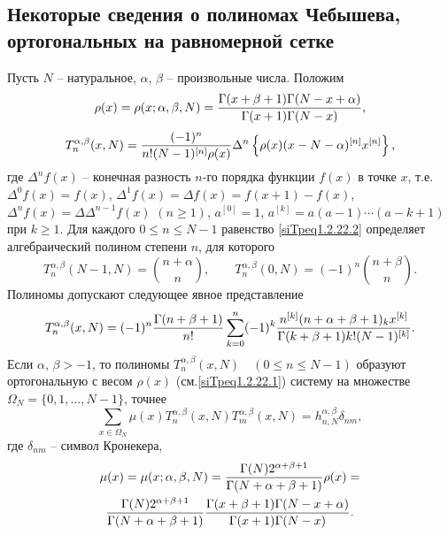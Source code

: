 \subsection{ Некоторые сведения о полиномах Чебышева,\\ ортогональных на равномерной  сетке}

 Пусть $N$ -- натуральное, $\alpha$, $\beta$ -- произвольные  числа. Положим
\begin{equation}\label{siTpeq1.2.22.1}
\rho(x)=\rho(x;\alpha,\beta,N)={\Gamma(x+\beta+1)
\Gamma(N-x+\alpha)\over \Gamma(x+1)\Gamma(N-x)},
\end{equation}
\begin{equation}\label{siTpeq1.2.22.2}
T_n^{\alpha,\beta}(x,N)={(-1)^n\over n!(N-1)^{[n]}\rho(x)}\Delta^n
\left\{\rho(x)(x-N-\alpha)^{[n]}x^{[n]}\right\},
\end{equation}
 где $\Delta^nf(x)$ -- конечная разность $n$-го порядка функции
     $f(x)$ в точке $x$, т.е. $\Delta^0f(x)=f(x)$,
$\Delta^1f(x)=\Delta f(x)=f(x+1)-f(x)$, $\Delta^nf(x)=\Delta
\Delta^{n-1}f(x)$ $(n\ge1)$, $a^{[0]}=1$,
$a^{[k]}=a(a-1)\cdots(a-k+1)$ при $k\ge1$. Для каждого $0\le n\le
N-1$ равенство \eqref{siTpeq1.2.22.2} определяет \cite{idprm35,idprm36,idprm37,idprm38} алгебраический полином степени $n$,
     для которого
$$
T_n^{\alpha,\beta}(N-1,N)={n+\alpha\choose n},\qquad
T_n^{\alpha,\beta}(0,N)=(-1)^n{n+\beta\choose n}.
$$
Полиномы допускают  следующее явное представление
\begin{equation}\label{siTpeq1.2.22.3}
T_n^{\alpha,\beta}(x,N)=(-1)^n{\Gamma(n+\beta+1)\over
n!}\sum_{k=0}^n(-1)^k {n^{[k]}(n+\alpha+\beta+1)_kx^{[k]}\over
\Gamma(k+\beta+1) k!(N-1)^{[k]}}.
\end{equation}
Если $\alpha$,
$\beta>-1$, то полиномы $T_n^{\alpha,\beta}(x,N)\quad (0\le n\le
N-1)$ образуют ортогональную  с весом $\rho(x)$ (см.\eqref{siTpeq1.2.22.1}) систему  на множестве
$\Omega_N=\{0,1,\ldots,N-1\}$, точнее
\begin{equation}\label{siTpeq1.2.22.4}
\sum_{x\in\Omega_N}\mu(x)T_n^{\alpha,\beta}(x,N)T_m^{\alpha,\beta}(x,N)
=h_{n,N}^{\alpha,\beta}\delta_{nm},
\end{equation}
где  $\delta_{nm}$ -- символ Кронекера,
\begin{multline}\label{siTpeq1.2.22.5}
\mu(x)=\mu(x;\alpha,\beta,N)={\Gamma(N)2^{\alpha+\beta+1} \over
\Gamma(N+\alpha+\beta+1)}\rho(x)=\\
{\Gamma(N)2^{\alpha+\beta+1}\over \Gamma(N+\alpha+\beta+1)}
{\Gamma(x+\beta+1)\Gamma(N-x+\alpha)\over \Gamma(x+1)\Gamma(N-x)}.
\end{multline}
